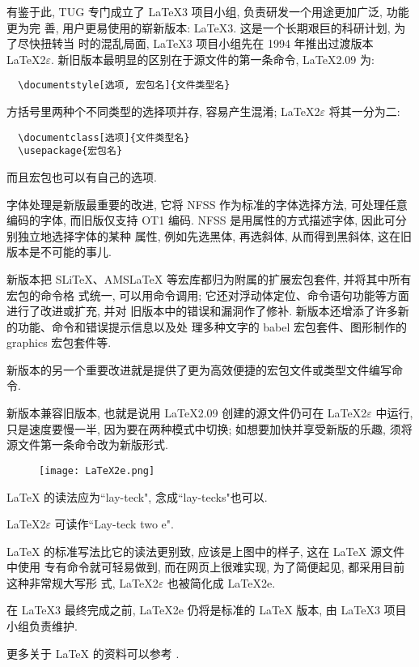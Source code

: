 有鉴于此, TUG 专门成立了 \LaTeX{}3\index{\LaTeX} 项目小组, 负责研发一个用途更加广泛, 功能更为完
善, 用户更易使用的崭新版本: \LaTeX{}3\index{\LaTeX}. 这是一个长期艰巨的科研计划, 为了尽快扭转当
时的混乱局面, \LaTeX{}3\index{\LaTeX} 项目小组先在 1994 年推出过渡版本 \LaTeX{}2$\varepsilon$\index{\LaTeX}.
新旧版本最明显的区别在于源文件的第一条命令, \LaTeX{}2.09 \index{\LaTeX} 为:
\begin{verbatim}
  \documentstyle[选项, 宏包名]{文件类型名}
\end{verbatim}
方括号里两种个不同类型的选择项并存, 容易产生混淆; \LaTeX{}2$\varepsilon$ \index{\LaTeX} 将其一分为二:
\begin{verbatim}
  \documentclass[选项]{文件类型名}
  \usepackage{宏包名}
\end{verbatim}
而且宏包也可以有自己的选项.

字体处理是新版最重要的改进, 它将 NFSS 作为标准的字体选择方法, 可处理任意编码的字体,
而旧版仅支持 OT1 编码. NFSS 是用属性的方式描述字体, 因此可分别独立地选择字体的某种
属性, 例如先选黑体, 再选斜体, 从而得到黑斜体, 这在旧版本是不可能的事儿.

新版本把 SLiTeX、AMSLaTeX 等宏库都归为附属的扩展宏包套件, 并将其中所有宏包的命令格
式统一, 可以用命令调用; 它还对浮动体定位、命令语句功能等方面进行了改进或扩充, 并对
旧版本中的错误和漏洞作了修补. 新版本还增添了许多新的功能、命令和错误提示信息以及处
理多种文字的 babel 宏包套件、图形制作的 graphics 宏包套件等.

新版本的另一个重要改进就是提供了更为高效便捷的宏包文件或类型文件编写命令.

新版本兼容旧版本, 也就是说用 \LaTeX{}2.09 \index{\LaTeX} 创建的源文件仍可在 \LaTeX{}2$\varepsilon$ \index{\LaTeX}
中运行, 只是速度要慢一半, 因为要在两种模式中切换; 如想要加快并享受新版的乐趣, 须将
源文件第一条命令改为新版形式.

\begin{figure}
  \centering
  \texttt{[image: LaTeX2e.png]}\\
\end{figure}

\LaTeX{} \index{\LaTeX}的读法应为``lay-teck", 念成``lay-tecks"也可以.

\LaTeX{}2$\varepsilon$ \index{\LaTeX}可读作``Lay-teck two e".

\LaTeX{} \index{\LaTeX}的标准写法比它的读法更别致, 应该是上图中的样子, 这在 \LaTeX{}\index{\LaTeX} 源文件中使用
专有命令就可轻易做到, 而在网页上很难实现, 为了简便起见, 都采用目前这种非常规大写形
式, \LaTeX{}2$\varepsilon$ \index{\LaTeX}也被简化成 \LaTeX{}2$\mathrm{e}$\index{\LaTeX}.

在 \LaTeX{}3 \index{\LaTeX}最终完成之前, \LaTeX{}2$\mathrm{e}$ \index{\LaTeX}仍将是标准的 \LaTeX{}\index{\LaTeX} 版本, 由
\LaTeX{}3 \index{\LaTeX}项目小组负责维护.

更多关于 \LaTeX{} \index{\LaTeX}的资料可以参考
\citet*{OetikerPartlHynaSchlegl2007,Leslie1994,MittelbachGoossensBraamsCarlisleRowley2004,ChenZhiJie2006,HuWei2011}.
